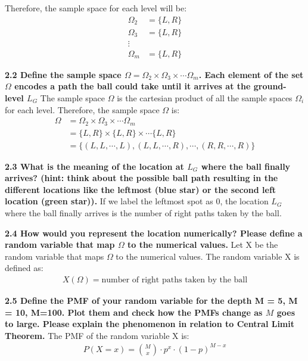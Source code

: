 \documentclass{article}
\begin{document}
Therefore, the sample space for each level will be:
\begin{align*}
    \Omega_2 &= \{L, R\} \\
    \Omega_3 &= \{L, R\} \\
    \vdots \\
    \Omega_m &= \{L, R\}
\end{align*}


\noindent \textbf{2.2 Define the sample space $\Omega = \Omega_2 \times \Omega_3 \times \cdots \Omega_m$. Each element of the set $\Omega$ 
encodes a path the ball could take until it arrives at the ground-level $L_G$} \newline
The sample space $\Omega$ is the cartesian product of all the sample spaces $\Omega_i$ for each level. Therefore, the sample space $\Omega$ is:
\begin{align*}
    \Omega &= \Omega_2 \times \Omega_3 \times \cdots \Omega_m \\
    &= \{L, R\} \times \{L, R\} \times \cdots \{L, R\} \\
    &= \{(L, L, \cdots, L), (L, L, \cdots, R), \cdots, (R, R, \cdots, R)\}
\end{align*}

\bigbreak

\noindent \textbf{2.3 What is the meaning of the location at $L_G$ where the ball finally arrives? (hint: think about
the possible ball path resulting in the different locations like the leftmost (blue star) or the second
left location (green star)).} \newline
If we label the leftmost spot as 0, the location $L_G$ where the ball finally arrives is the number of right paths taken by the ball.

\bigbreak

\noindent \textbf{2.4  How would you represent the location numerically? Please define a random variable that map $\Omega$ to the numerical values.}\newline
Let X be the random variable that maps $\Omega$ to the numerical values. The random variable X is defined as:
\begin{align*}
    X(\Omega) = \text{number of right paths taken by the ball}
\end{align*}

\bigbreak

\noindent \textbf{2.5 Define the PMF of your random variable for the depth M = 5, M = 10, M=100. Plot them
and check how the PMFs change as $M$ goes to large. Please explain the phenomenon in relation to Central Limit Theorem.} \newline
The PMF of the random variable X is:
\begin{align*}
    P(X = x) = \binom{M}{x} \cdot p^x \cdot (1-p)^{M-x}
\end{align*}
\end{document}
